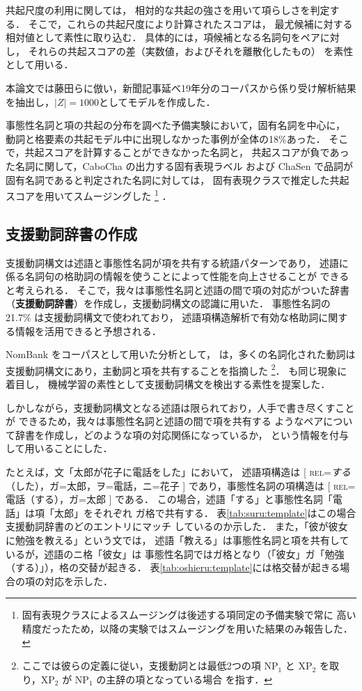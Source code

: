 \documentclass[japanese]{jnlp_1.4}
\begin{document}
共起尺度の利用に関しては，
相対的な共起の強さを用いて項らしさを判定する．
そこで，これらの共起尺度により計算されたスコアは，
最尤候補に対する相対値として素性に取り込む．
具体的には，項候補となる名詞句をペアに対し，
それらの共起スコアの差（実数値，およびそれを離散化したもの）
を素性として用いる．

本論文では藤田らに倣い，新聞記事延べ19年分のコーパスから係り受け解析結果
を抽出し，$|Z|=1000$としてモデルを作成した．

事態性名詞と項の共起の分布を調べた予備実験において，固有名詞を中心に，
動詞と格要素の共起モデル中に出現しなかった事例が全体の18\%あった．
そこで，共起スコアを計算することができなかった名詞と，
共起スコアが負であった名詞に関して，CaboCha の出力する固有表現ラベル
および ChaSen で品詞が固有名詞であると判定された名詞に対しては，
固有表現クラスで推定した共起スコアを用いてスムージングした
\footnote{固有表現クラスによるスムージングは後述する項同定の予備実験で常に
高い精度だったため，以降の実験ではスムージングを用いた結果のみ報告した．}
．

\subsection{支援動詞辞書の作成}

支援動詞構文は述語と事態性名詞が項を共有する統語パターンであり，
述語に係る名詞句の格助詞の情報を使うことによって性能を向上させることが
できると考えられる．
そこで，我々は事態性名詞と述語の間で項の対応がついた辞書
（\textbf{支援動詞辞書}）を作成し，支援動詞構文の認識に用いた．
事態性名詞の 21.7\% は支援動詞構文で使われており，
述語項構造解析で有効な格助詞に関する情報を活用できると予想される．

NomBank をコーパスとして用いた分析として，
\cite{meyers:2004:ACL}は，多くの名詞化された動詞は
支援動詞構文にあり，主動詞と項を共有することを指摘した
\footnote{ここでは彼らの定義に従い，支援動詞とは最低2つの項
NP$_1$ と XP$_2$ を取り，XP$_2$ が NP$_1$ の主辞の項となっている場合
を指す．}．
\cite{jiang:2006:EMNLP} も同じ現象に着目し，
機械学習の素性として支援動詞構文を検出する素性を提案した．

しかしながら，支援動詞構文となる述語は限られており，人手で書き尽くすことが
できるため，我々は事態性名詞と述語の間で項を共有する
ようなペアについて辞書を作成し，どのような項の対応関係になっているか，
という情報を付与して用いることにした．

たとえば，文「太郎が花子に電話をした」において，
述語項構造は
[ \textsc{rel}=\emph{する}（した），ガ=太郎，ヲ=電話，ニ=花子 ]
であり，事態性名詞の項構造は
[ \textsc{rel}=電話（する），ガ=太郎 ]
である．
この場合，述語「する」と事態性名詞「電話」は項「太郎」をそれぞれ
ガ格で共有する．
表\ref{tab:suru:template}はこの場合支援動詞辞書のどのエントリにマッチ
しているのか示した．
また，「彼が彼女に勉強を教える」という文では，
述語「教える」は事態性名詞と項を共有しているが，述語のニ格「彼女」は
事態性名詞ではガ格となり（「彼女」ガ「勉強（する）」），格の交替が起きる．
表\ref{tab:oshieru:template}には格交替が起きる場合の項の対応を示した．
\end{document}
